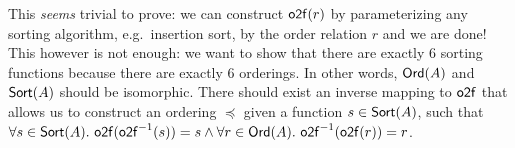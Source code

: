 \begin{center}
\end{center}

This \textit{seems} trivial to prove: we can construct $\operatorname{\mathsf{o2f}}(r)$ by parameterizing
any sorting algorithm, e.g.\ insertion sort, by the order relation $r$ and we are done!
This however is not enough: we want to show that there are exactly 6 sorting functions because
there are exactly 6 orderings. In other words, $\operatorname{\mathsf{Ord}}(A)$ and $\operatorname{\mathsf{Sort}}(A)$ should be
isomorphic. There should exist an inverse mapping to $\operatorname{\mathsf{o2f}}$ that allows us to construct
an ordering $\preccurlyeq$ given a function $s \in \operatorname{\mathsf{Sort}}(A)$, such that
$\forall s \in \operatorname{\mathsf{Sort}}(A).\, \operatorname{\mathsf{o2f}}(\operatorname{\mathsf{o2f}}^{-1}(s)) = s \land \forall r \in \operatorname{\mathsf{Ord}}(A).\, \operatorname{\mathsf{o2f}}^{-1}(\operatorname{\mathsf{o2f}}(r)) = r$.

